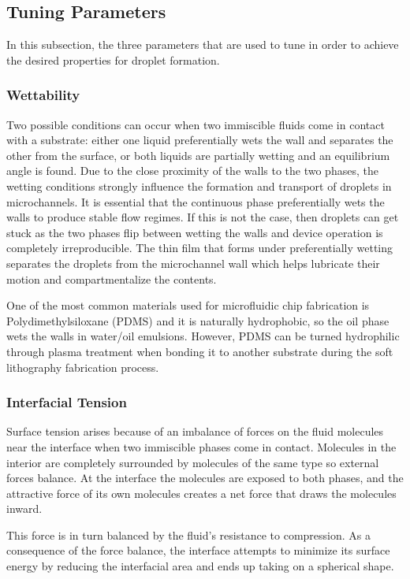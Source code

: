 \subsection{Tuning Parameters}
In this subsection, the three parameters that are used to tune in order to achieve the desired properties for droplet formation. 

\subsubsection{Wettability}
Two possible conditions can occur when two immiscible fluids come in contact with a substrate: either one liquid preferentially wets the wall and separates the other from the surface, or both liquids are partially wetting and an equilibrium angle is found. Due to the close proximity of the walls to the two phases, the wetting conditions strongly influence the formation and transport of droplets in microchannels. It is essential that the continuous phase preferentially wets the walls to produce stable flow regimes. If this is not the case, then droplets can get stuck as the two phases flip between wetting the walls and device operation is completely irreproducible. The thin film that forms under preferentially wetting separates the droplets from the microchannel wall which helps lubricate their motion and compartmentalize the contents. \parencite{Christopher2007}

One of the most common materials used for microfluidic chip fabrication is Polydimethylsiloxane (PDMS) and it is naturally hydrophobic, so the oil phase wets the walls in water/oil emulsions. However, PDMS can be turned hydrophilic through plasma treatment when bonding it to another substrate during the soft lithography fabrication process. \parencite{Zhu2017,Christopher2007}

\subsubsection{Interfacial Tension} 
Surface tension arises because of an imbalance of forces on the fluid molecules near the interface when two immiscible phases come in contact. Molecules in the interior are completely surrounded by molecules of the same type so external forces balance. At the interface the molecules are exposed to both phases, and the attractive force of its own molecules creates a net force that draws the molecules inward. \parencite{Peng2011,Lee2021,Shui2009}

This force is in turn balanced by the fluid’s resistance to compression. As a consequence of the force balance, the interface attempts to minimize its surface energy by reducing the interfacial area and ends up taking on a spherical shape. \parencite{Peng2011,Lee2021,Shui2009}

